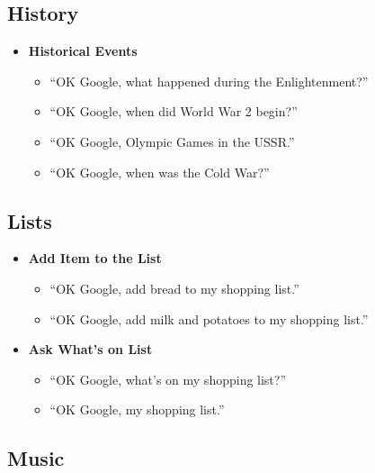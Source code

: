 \documentclass[
  jou,
  floatsintext,
  longtable,
  a4paper,
  nolmodern,
  notxfonts,
  notimes,
  colorlinks=true,linkcolor=blue,citecolor=blue,urlcolor=blue]{apa7}
\providecommand{\tightlist}{%
  \setlength{\itemsep}{0pt}\setlength{\parskip}{0pt}}
\begin{document}
\subsection{History}\label{history}

\begin{itemize}
\tightlist
\item
  \textbf{Historical Events}

  \begin{itemize}
  \tightlist
  \item
    ``OK Google, what happened during the Enlightenment?''
  \item
    ``OK Google, when did World War 2 begin?''
  \item
    ``OK Google, Olympic Games in the USSR.''
  \item
    ``OK Google, when was the Cold War?''
  \end{itemize}
\end{itemize}

\subsection{Lists}\label{lists}

\begin{itemize}
\tightlist
\item
  \textbf{Add Item to the List}

  \begin{itemize}
  \tightlist
  \item
    ``OK Google, add bread to my shopping list.''
  \item
    ``OK Google, add milk and potatoes to my shopping list.''
  \end{itemize}
\item
  \textbf{Ask What's on List}

  \begin{itemize}
  \tightlist
  \item
    ``OK Google, what's on my shopping list?''
  \item
    ``OK Google, my shopping list.''
  \end{itemize}
\end{itemize}

\subsection{Music}\label{music}
\end{document}
